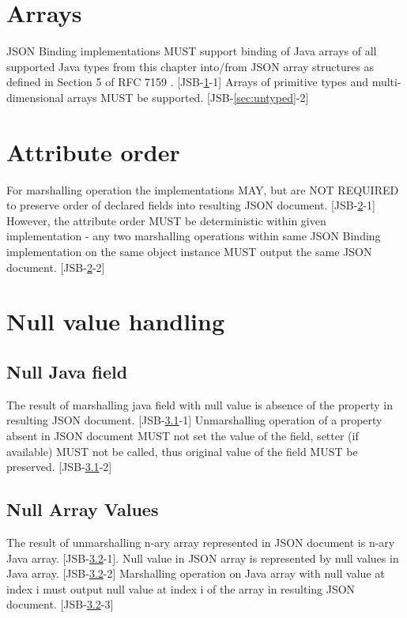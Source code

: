 \section{Arrays}
\label{sec:arrays}
JSON Binding implementations MUST support binding of Java arrays of all supported Java types from this chapter into/from JSON array structures as defined in Section 5 of RFC 7159 \cite{rfc7159}. [JSB-\ref{sec:arrays}-1] Arrays of primitive types and multi-dimensional arrays MUST be supported. [JSB-\ref{sec:untyped}-2]

\section{Attribute order}
\label{sec:attributes}
For marshalling operation the implementations MAY, but are NOT REQUIRED to preserve order of declared fields into resulting JSON document. [JSB-\ref{sec:attributes}-1] However, the attribute order MUST be deterministic within given implementation - any two marshalling operations within same JSON Binding implementation on the same object instance MUST output the same JSON document. [JSB-\ref{sec:attributes}-2]

\section{Null value handling}
\label{sec:null}

\subsection{Null Java field}
\label{subsec:nullfield}
The result of marshalling java field with null value is absence of the property in resulting JSON document. [JSB-\ref{subsec:nullfield}-1]
Unmarshalling operation of a property absent in JSON document MUST not set the value of the field, setter (if available) MUST not be called, thus original value of the field MUST be preserved. [JSB-\ref{subsec:nullfield}-2]

\subsection{Null Array Values}
\label{subsec:nullarray}
The result of unmarshalling n-ary array represented in JSON document is n-ary Java array. [JSB-\ref{subsec:nullarray}-1]. Null value in JSON array is represented by null values in Java array. [JSB-\ref{subsec:nullarray}-2]
Marshalling operation on Java array with null value at index i must output null value at index i of the array in resulting JSON document. [JSB-\ref{subsec:nullarray}-3]

